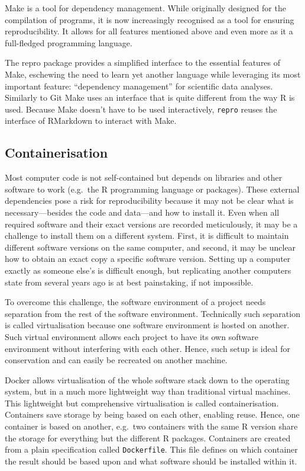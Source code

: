\documentclass[12pt,a4paper,twoside]{article}
\begin{document}
Make is a tool for dependency management.
While originally designed for the compilation of programs, it is now increasingly recognised as a tool for ensuring reproducibility.
It allows for all features mentioned above and even more as it a full-fledged programming language.

The repro package provides a simplified interface to the essential features of Make, eschewing the need to learn yet another language while leveraging its most important feature: ``dependency management'' for scientific data analyses. Similarly to Git Make uses an interface that is quite different from the way R is used.
Because Make doesn't have to be used interactively, \texttt{repro} reuses the interface of RMarkdown to interact with Make.

\hypertarget{containerisation}{%
\subsection{Containerisation}\label{containerisation}}

Most computer code is not self-contained but depends on libraries and other software to work (e.g.~the R programming language or packages).
These external dependencies pose a risk for reproducibility because it may not be clear what is necessary---besides the code and data---and how to install it.
Even when all required software and their exact versions are recorded meticulously, it may be a challenge to install them on a different system.
First, it is difficult to maintain different software versions on the same computer, and second, it may be unclear how to obtain an exact copy a specific software version.
Setting up a computer exactly as someone else's is difficult enough, but replicating another computers state from several years ago is at best painstaking, if not impossible.

To overcome this challenge, the software environment of a project needs separation from the rest of the software environment. Technically such separation is called virtualisation because one software environment is hosted on another. Such virtual environment allows each project to have its own software environment without interfering with each other. Hence, such setup is ideal for conservation and can easily be recreated on another machine.

Docker allows virtualisation of the whole software stack down to the operating system, but in a much more lightweight way than traditional virtual machines. This lightweight but comprehensive virtualisation is called containerisation. Containers save storage by being based on each other, enabling reuse. Hence, one container is based on another, e.g.~two containers with the same R version share the storage for everything but the different R packages. Containers are created from a plain specification called \texttt{Dockerfile}. This file defines on which container the result should be based upon and what software should be installed within it.
\end{document}
